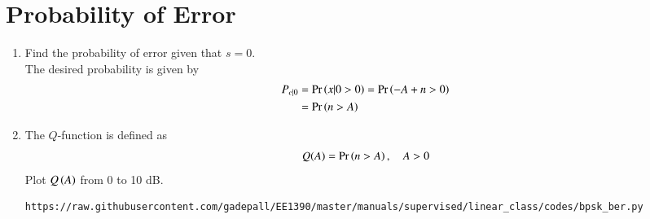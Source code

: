 \documentclass[journal,12pt,twocolumn]{IEEEtran}
\renewcommand\thesection{\arabic{section}}
\begin{document}
\section{Probability of Error}
\begin{enumerate}[label=\thesection.\arabic*
,ref=\thesection.\theenumi]
\item Find the probability of error given that $s=0$.
\\
\solution
The desired probability is given by 
\begin{align}
P_{e|0}&=\Pr\left(x|0 >  0\right) = \Pr\left(-A + n > 0\right)
\\
&=\Pr\left( n > A\right)
\end{align}
%
\item
The $Q$-function is defined as
\begin{equation}
Q(A) = \Pr\left(n > A\right), \quad A > 0
\end{equation}
Plot  $Q\left(A\right)$ from 0 to 10 dB.
\\
\solution
\begin{lstlisting}
https://raw.githubusercontent.com/gadepall/EE1390/master/manuals/supervised/linear_class/codes/bpsk_ber.py
\end{lstlisting}

%

\end{enumerate}
\end{document}
